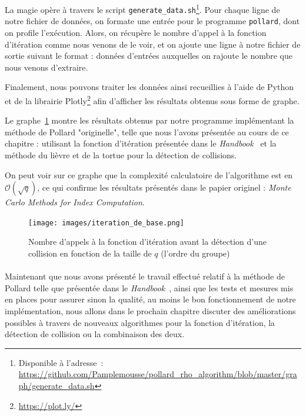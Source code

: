       La magie opère à travers le script \lstinline{generate_data.sh}\footnote{Disponible à l'adresse~: \url{https://github.com/Pamplemousse/pollard_rho_algorithm/blob/master/graph/generate_data.sh}}.
      Pour chaque ligne de notre fichier de données, on formate une entrée pour le programme \lstinline{pollard}, dont on profile l'exécution.
      Alors, on récupère le nombre d'appel à la fonction d'itération comme nous venons de le voir, et on ajoute une ligne à notre fichier de sortie suivant le format : données d'entrées auxquelles on rajoute le nombre que nous venons d'extraire.

      Finalement, nous pouvons traiter les données ainsi recueillies à l'aide de Python et de la librairie Plotly\footnote{\url{https://plot.ly/}} afin d'afficher les résultats obtenus sous forme de graphe.

      Le graphe~\ref{fig:basic_iteration_results} montre les résultats obtenus par notre programme implémentant la méthode de Pollard "originelle", telle que nous l'avons présentée au cours de ce chapitre : utilisant la fonction d'itération présentée dans le \textit{Handbook}~\autocite[107]{handbook} et la méthode du lièvre et de la tortue pour la détection de collisions.

      On peut voir sur ce graphe que la complexité calculatoire de l'algorithme est en $\mathcal{O}(\sqrt{q})$, ce qui confirme les résultats présentés dans le papier originel : \textit{Monte Carlo Methods for Index Computation}\autocite{pollard0}.

      \begin{figure}
        \center{}
        \texttt{[image: images/iteration\_de\_base.png]}
        \caption{Nombre d'appels à la fonction d'itération avant la détection d'une collision en fonction de la taille de $q$ (l'ordre du groupe)}
        \label{fig:basic_iteration_results}
      \end{figure}


    \paragraph{}
    Maintenant que nous avons présenté le travail effectué relatif à la méthode de Pollard telle que présentée dans le \textit{Handbook}~\autocite[106]{handbook}, ainsi que les tests et mesures mis en places pour assurer sinon la qualité, au moins le bon fonctionnement de notre implémentation, nous allons dans le prochain chapitre discuter des améliorations possibles à travers de nouveaux algorithmes pour la fonction d'itération, la détection de collision ou la combinaison des deux.
